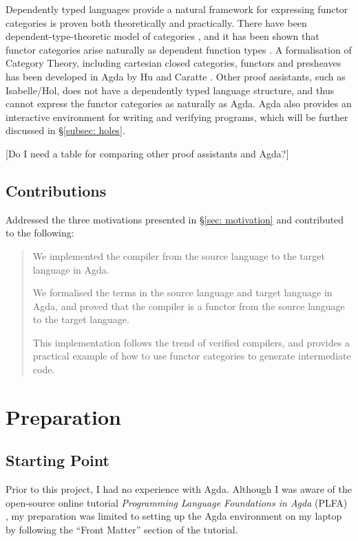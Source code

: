 \documentclass[12pt,twoside,a4paper]{report}
\theoremstyle{definition}
\theoremstyle{definition}
\newcounter{motivation}
\newcommand{\secref}[1]{\S\ref{#1}}
\begin{document}
        Dependently typed languages provide a natural framework for expressing functor categories is proven both theoretically and practically. There have been dependent-type-theoretic model of categories \cite{Dybjer}, and it has been shown that functor categories arise naturally as dependent function types \cite{Jacobs}. A formalisation of Category Theory, including cartesian closed categories, functors and presheaves has been developed in Agda by Hu and Caratte \cite{Cat_Agda}. Other proof assistants, such as Isabelle/Hol, does not have a dependently typed language structure, and thus cannot express the functor categories as naturally as Agda. Agda also provides an interactive environment for writing and verifying programs, which will be further discussed in \secref{subsec: holes}.

        [Do I need a table for comparing other proof assistants and Agda?]


    \section{Contributions}
        Addressed the three motivations presented in \secref{sec: motivation} and contributed to the following:
        \begin{quote}
            \savedmotivationI
            We implemented the compiler from the source language to the target language in Agda. 

            \savedmotivationII
            We formalised the terms in the source language and target language in Agda, and proved that the compiler is a functor from the source language to the target language. 

            \savedmotivationIII
            This implementation follows the trend of verified compilers, and provides a practical example of how to use functor categories to generate intermediate code.
        \end{quote}


\chapter{Preparation}
    \minitoc

    \section{Starting Point}
    Prior to this project, I had no experience with Agda. Although I was aware of the open-source online tutorial \textit{Programming Language Foundations in Agda} (PLFA) \cite{plfa}, my preparation was limited to setting up the Agda environment on my laptop by following the ``Front Matter'' section of the tutorial.
\end{document}
